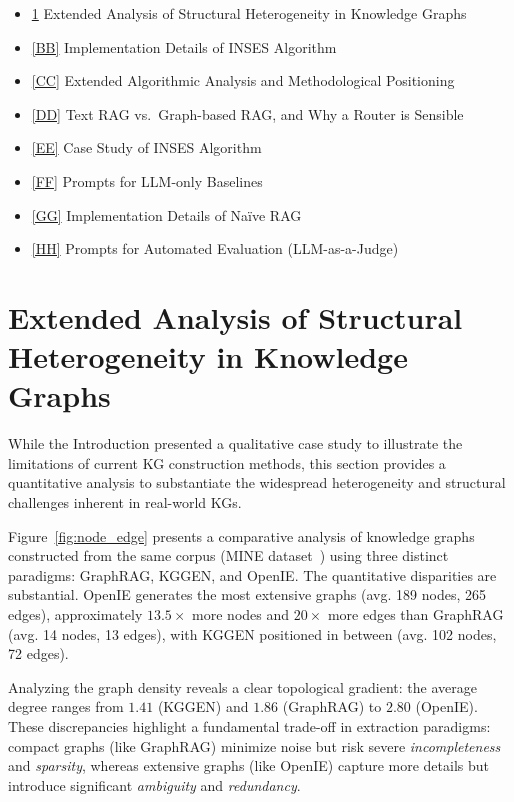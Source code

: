 \documentclass{article}
\theoremstyle{plain}
\theoremstyle{definition}
\theoremstyle{remark}
\begin{document}
\begin{itemize}
\item  \ref{AA} Extended Analysis of Structural Heterogeneity in Knowledge Graphs
\item  \ref{BB} Implementation Details of INSES Algorithm 
\item  \ref{CC} Extended Algorithmic Analysis and Methodological Positioning 
\item  \ref{DD} Text RAG vs.\ Graph-based RAG, and Why a Router is Sensible
\item  \ref{EE} Case Study of INSES Algorithm
\item  \ref{FF} Prompts for LLM-only Baselines
\item  \ref{GG} Implementation Details of Naïve RAG
\item  \ref{HH} Prompts for Automated Evaluation (LLM-as-a-Judge)
\end{itemize}

\section{Extended Analysis of Structural Heterogeneity in Knowledge Graphs} \label{AA}

While the Introduction presented a qualitative case study to illustrate the limitations of current KG construction methods, this section provides a quantitative analysis to substantiate the widespread heterogeneity and structural challenges inherent in real-world KGs.

Figure~\ref{fig:node_edge} presents a comparative analysis of knowledge graphs constructed from the same corpus (MINE dataset~\citep{mo2025kggen}) using three distinct paradigms: GraphRAG, KGGEN, and OpenIE. The quantitative disparities are substantial. OpenIE generates the most extensive graphs (avg. 189 nodes, 265 edges), approximately $13.5\times$ more nodes and $20\times$ more edges than GraphRAG (avg. 14 nodes, 13 edges), with KGGEN positioned in between (avg. 102 nodes, 72 edges).

Analyzing the graph density reveals a clear topological gradient: the average degree ranges from $1.41$ (KGGEN) and $1.86$ (GraphRAG) to $2.80$ (OpenIE). These discrepancies highlight a fundamental trade-off in extraction paradigms: compact graphs (like GraphRAG) minimize noise but risk severe \textit{incompleteness} and \textit{sparsity}, whereas extensive graphs (like OpenIE) capture more details but introduce significant \textit{ambiguity} and \textit{redundancy}.
\end{document}
